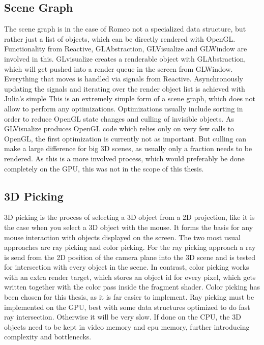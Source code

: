 \subsection{Scene Graph}
The scene graph is in the case of Romeo not a specialized data structure, but rather just a list of objects, which can be directly rendered with OpenGL. Functionality from Reactive, GLAbstraction, GLVisualize and GLWindow are involved in this. GLvisualize creates a renderable object with GLAbstraction, which will get pushed into a render queue in the screen from GLWindow. Everything that moves is handled via signals from Reactive.
Asynchronously updating the signals and iterating over the render object list is achieved with Julia's simple 
This is an extremely simple form of a scene graph, which does not allow to perform any optimizations.
Optimizations usually include sorting in order to reduce OpenGL state changes and culling of invisible objects.
As GLVisualize produces OpenGL code which relies only on very few calls to OpenGL, the first optimization is currently not as important.
But culling can make a large difference for big 3D scenes, as usually only a fraction needs to be rendered.
As this is a more involved process, which would preferably be done completely on the GPU, this was not in the scope of this thesis.

\subsection{3D Picking}

3D picking is the process of selecting a 3D object from a 2D projection, like it is the case when you select a 3D object with the mouse.
It forms the basis for any mouse interaction with objects displayed on the screen.
The two most usual approaches are ray picking and color picking.
For the ray picking approach a ray is send from the 2D position of the camera plane into the 3D scene and is tested for intersection with every object in the scene. In contrast, color picking works with an extra render target, which stores an object id for every pixel, which gets written together with the color pass inside the fragment shader.
Color picking has been chosen for this thesis, as it is far easier to implement. Ray picking must be implemented on the GPU, best with some data structures optimized to do fast ray intersection. Otherwise it will be very slow. If done on the CPU, the 3D objects need to be kept in video memory and cpu memory, further introducing complexity and bottlenecks.

